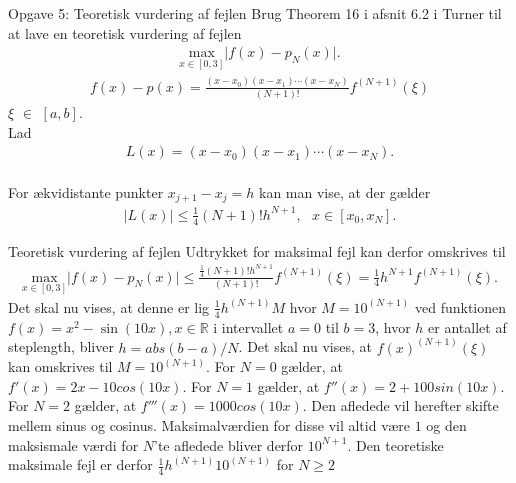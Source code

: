 \begin{frame}{Opgave 5: Teoretisk vurdering af fejlen}
    Brug Theorem 16 i afsnit 6.2 i Turner til at lave en teoretisk vurdering af fejlen
    \begin{align*}
    \underset{x \in \left [0,3 \right ]}{\text{max}} \lvert f(x)-p_N(x) \rvert.
    \end{align*}
    \begin{align*}
    f(x)-p(x) = \frac{(x-x_0)(x-x_1)\cdots(x-x_N)}{(N+1)!}f^{(N+1)}(\xi)
    \end{align*}
     $\xi$ $\in$ $\left [a,b \right ]$.
    \\
    Lad
    \begin{align*}
    L(x)=(x-x_0)(x-x_1)\cdots(x-x_N).
    \end{align*}
    \\
    For ækvidistante punkter $x_{j+1} - x_j = h$ kan man vise, at der gælder
    \begin{align*}
    \lvert L(x) \rvert \leq \frac{1}{4}(N+1)!h^{N+1}, \text{   } x \in \left [x_0, x_N \right ].
    \end{align*}
\end{frame}

\begin{frame}{Teoretisk vurdering af fejlen}
    Udtrykket for maksimal fejl kan derfor omskrives til
    \begin{align*}
    \underset{x \in \left [0,3 \right ]}{\text{max}} \lvert f(x)-p_N(x) \rvert \leq \frac{\frac{1}{4}(N+1)!h^{N+1}}{(N+1)!}f^{(N+1)}(\xi)=\frac{1}{4}h^{N+1}f^{(N+1)}(\xi).
    \end{align*}
    Det skal nu vises, at denne er lig $\frac{1}{4}h^{(N+1)}M$ hvor $M=10^{(N+1)}$ ved funktionen $f(x)=x^2-\sin(10x), x \in \mathbb{R}$ i intervallet $a=0$ til $b=3$, hvor $h$ er antallet af steplength, bliver $h=abs(b-a)/N$. 
    Det skal nu vises, at $f(x)^{(N+1)}(\xi)$ kan omskrives til $M=10^{(N+1)}$.
    For $N=0$ gælder, at $f'(x)=2x-10cos(10x)$.
    For $N=1$ gælder, at $f''(x)=2+100sin(10x)$.
    For $N=2$ gælder, at $f'''(x)=1000cos(10x)$. 
    Den afledede vil herefter skifte mellem sinus og cosinus.
    Maksimalværdien for disse vil altid være $1$ og den maksismale værdi for $N$'te afledede bliver derfor $10^{N+1}$.
    Den teoretiske maksimale fejl er derfor $\frac{1}{4}h^{(N+1)}10^{(N+1)}$ for $N \geq 2$
\end{frame}